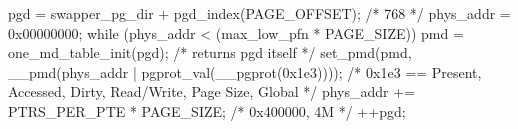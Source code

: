 \documentclass[varwidth=36em,crop]{standalone}
\begin{document}
\begin{ccode}
pgd = swapper_pg_dir + pgd_index(PAGE_OFFSET); /* 768 */
phys_addr = 0x00000000;
while (phys_addr < (max_low_pfn * PAGE_SIZE))
{
  pmd = one_md_table_init(pgd); /* returns pgd itself */
  set_pmd(pmd, __pmd(phys_addr | pgprot_val(__pgprot(0x1e3))));
  /* 0x1e3 == Present, Accessed, Dirty, Read/Write, Page Size, Global */
  phys_addr += PTRS_PER_PTE * PAGE_SIZE; /* 0x400000, 4M */
  ++pgd;
}
\end{ccode}
\end{document}
